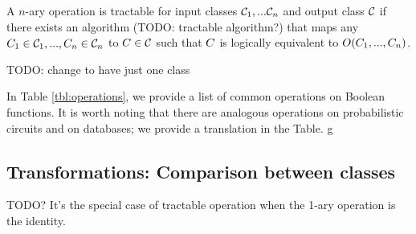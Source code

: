 \begin{definition}
    A $n$-ary operation is tractable for input classes $\mathcal{C}_1, ... \mathcal{C}_n$ and output class $\mathcal{C}$ if there exists an algorithm (TODO: tractable algorithm?)
    that maps any $C_1 \in \mathcal{C}_1, ..., C_n \in \mathcal{C}_n$ to $C \in \mathcal{C}$ such that $C$ is logically equivalent to $O(C_1, ..., C_n)$.

    TODO: change to have just one class
\end{definition}

In Table \ref{tbl:operations}, we provide a list of common operations on Boolean functions. It is worth noting that there are analogous operations on probabilistic circuits and on databases; we provide a translation in the Table. g




\subsection{Transformations: Comparison between classes}

TODO? It's the special case of tractable operation when the 1-ary operation is the identity.



